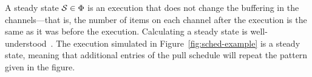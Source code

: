 A steady state ${\cal S} \in \Phi$ is an execution that does not
change the buffering in the channels---that is, the number of items on
each channel after the execution is the same as it was before the
execution. Calculating a steady state is well-understood~\cite{LM87-i}.
The execution simulated in Figure~\ref{fig:sched-example} is a steady state,
meaning that additional entries of the pull schedule will repeat the
pattern given in the figure.




